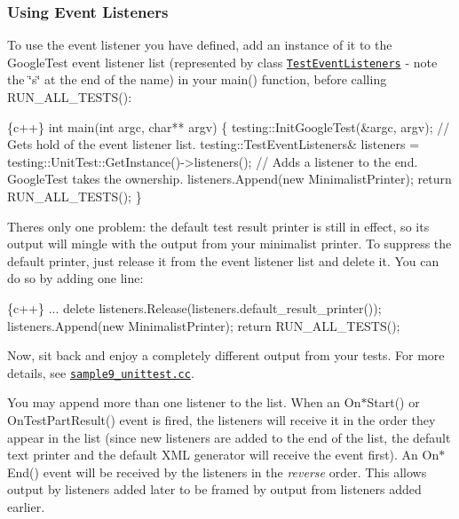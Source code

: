 \subsubsection*{Using Event Listeners}

To use the event listener you have defined, add an instance of it to the Google\+Test event listener list (represented by class \href{reference/testing.md#TestEventListeners}{\tt {\ttfamily Test\+Event\+Listeners}} -\/ note the \char`\"{}s\char`\"{} at the end of the name) in your {\ttfamily main()} function, before calling {\ttfamily R\+U\+N\+\_\+\+A\+L\+L\+\_\+\+T\+E\+S\+T\+S()}\+:


\begin{DoxyCode}
\{c++\}
int main(int argc, char** argv) \{
  testing::InitGoogleTest(&argc, argv);
  // Gets hold of the event listener list.
  testing::TestEventListeners& listeners =
      testing::UnitTest::GetInstance()->listeners();
  // Adds a listener to the end.  GoogleTest takes the ownership.
  listeners.Append(new MinimalistPrinter);
  return RUN\_ALL\_TESTS();
\}
\end{DoxyCode}


There\textquotesingle{}s only one problem\+: the default test result printer is still in effect, so its output will mingle with the output from your minimalist printer. To suppress the default printer, just release it from the event listener list and delete it. You can do so by adding one line\+:


\begin{DoxyCode}
\{c++\}
  ...
  delete listeners.Release(listeners.default\_result\_printer());
  listeners.Append(new MinimalistPrinter);
  return RUN\_ALL\_TESTS();
\end{DoxyCode}


Now, sit back and enjoy a completely different output from your tests. For more details, see \href{https://github.com/google/googletest/blob/main/googletest/samples/sample9_unittest.cc}{\tt sample9\+\_\+unittest.\+cc}.

You may append more than one listener to the list. When an {\ttfamily On$\ast$\+Start()} or {\ttfamily On\+Test\+Part\+Result()} event is fired, the listeners will receive it in the order they appear in the list (since new listeners are added to the end of the list, the default text printer and the default X\+ML generator will receive the event first). An {\ttfamily On$\ast$\+End()} event will be received by the listeners in the {\itshape reverse} order. This allows output by listeners added later to be framed by output from listeners added earlier.


